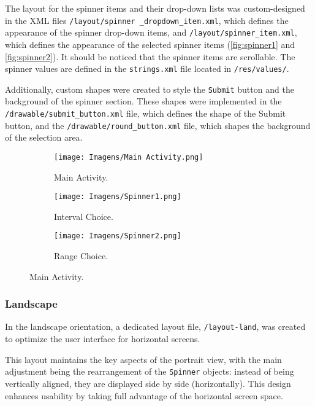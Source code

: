 \documentclass{article}
\begin{document}
The layout for the spinner items and their drop-down lists was custom-designed in the XML files \texttt{/layout/spinner \_dropdown\_item.xml}, which defines the appearance of the spinner drop-down items, and \texttt{/layout/spinner\_item.xml}, which defines the appearance of the selected spinner items (\autoref{fig:spinner1} and \autoref{fig:spinner2}).
It should be noticed that the spinner items are scrollable.
The spinner values are defined in the \texttt{strings.xml} file located in \texttt{/res/values/}. 


Additionally, custom shapes were created to style the \texttt{Submit} button and the background of the spinner section. 
These shapes were implemented in the \texttt{/drawable/submit\_button.xml} file, which defines the shape of the Submit button, and the \texttt{/drawable/round\_button.xml} file, which shapes the background of the selection area.


\begin{figure}[ht]
    \centering
    
    \begin{subfigure}[t]{0.30\linewidth}
        \centering
        \texttt{[image: Imagens/Main Activity.png]}
        \caption{Main Activity.}
        \label{fig:mainactivity}
    \end{subfigure}
    \hfill
    \begin{subfigure}[t]{0.30\textwidth}
        \centering
        \texttt{[image: Imagens/Spinner1.png]}
        \caption{Interval Choice.}
        \label{fig:spinner1}
    \end{subfigure}
    \hfill
    \begin{subfigure}[t]{0.30\textwidth}
        \centering
        \texttt{[image: Imagens/Spinner2.png]}
        \caption{Range Choice.}
        \label{fig:spinner2}
    \end{subfigure}

    \caption{Main Activity.}
    \label{fig:whole main activity}
\end{figure}

\subsubsection{Landscape}

In the landscape orientation, a dedicated layout file, \texttt{/layout-land}, was created to optimize the user interface for horizontal screens. 

This layout maintains the key aspects of the portrait view, with the main adjustment being the rearrangement of the \texttt{Spinner} objects: instead of being vertically aligned, they are displayed side by side (horizontally). This design enhances usability by taking full advantage of the horizontal screen space.
\end{document}
